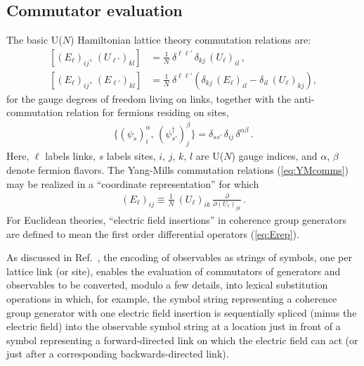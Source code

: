 \documentclass [12pt]{article}
\begin{document}
\subsection {Commutator evaluation}

The basic U($N$) Hamiltonian lattice theory commutation relations are:
\begin{subequations}\label{eq:YMcomms}
\begin{align}
    [ (E_\ell)_{ij},\, (U_{\ell'})_{kl}]
    &=
    \frac {1}{N} \> \delta^{\ell \ell'} \, \delta_{kj} \, (U_\ell)_{il} \,,
\\
    [ (E_\ell)_{ij},\, (E_{\ell'})_{kl}]
    &=
    \frac {1}{N} \> \delta^{\ell \ell'}
    \left(
	\delta_{kj} \, (E_\ell)_{il} - \delta_{il} \, (U_\ell)_{kj}
    \right),
\end{align}
\end{subequations}
for the gauge degrees of freedom living on links, together with the
anti-commutation relation for fermions residing on sites,
\begin{align}
    \{ (\psi_s)^\alpha_i, \,  (\psi^\dagger_{s'})^\beta_j \}
    =
    \delta_{s s'} \, \delta_{ij} \, \delta^{\alpha\beta} \,.
\end{align}
Here, $\ell$ labels links, $s$ labels sites,
$i$, $j$, $k$, $l$ are U($N$) gauge indices,
and $\alpha$, $\beta$ denote fermion flavors.
The Yang-Mills commutation relations (\ref{eq:YMcomms})
may be realized in a ``coordinate representation'' for which
\begin{align}
    (E_\ell)_{ij} \equiv \frac 1N \> (U_\ell)_{ik} \,\frac {\partial}{\partial (U_\ell)_{jk}} \,.
\label{eq:Erep}
\end{align}
For Euclidean theories, ``electric field insertions'' in
coherence group generators are defined to mean the first order differential
operators (\ref{eq:Erep}).

As discussed in Ref.~\cite{CSVAII}, the encoding of observables
as strings of symbols, one per lattice link (or site), enables
the evaluation of commutators of generators and observables
to be converted, modulo a few details,
into lexical substitution operations in which, for example,
the symbol string representing a coherence group generator
with one electric field insertion
is sequentially spliced (minus the electric field)
into the observable symbol string at a location
just in front of a symbol representing a forward-directed
link on which the electric field can act
(or just after a corresponding backwards-directed link).
\end{document}
